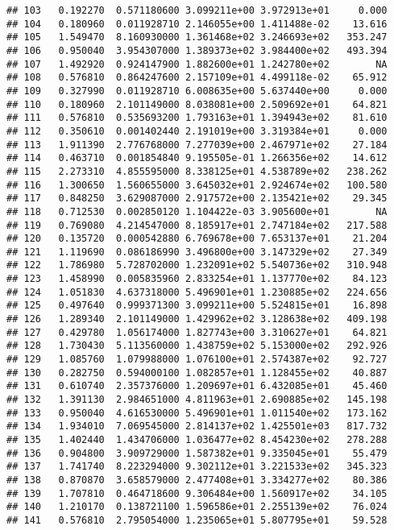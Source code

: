 \documentclass[
]{article}
\begin{document}
\begin{verbatim}
## 103   0.192270  0.571180600 3.099211e+00 3.972913e+01     0.000
## 104   0.180960  0.011928710 2.146055e+00 1.411488e-02    13.616
## 105   1.549470  8.160930000 1.361468e+02 3.246693e+02   353.247
## 106   0.950040  3.954307000 1.389373e+02 3.984400e+02   493.394
## 107   1.492920  0.924147900 1.882600e+01 1.242780e+02        NA
## 108   0.576810  0.864247600 2.157109e+01 4.499118e-02    65.912
## 109   0.327990  0.011928710 6.008635e+00 5.637440e+00     0.000
## 110   0.180960  2.101149000 8.038081e+00 2.509692e+01    64.821
## 111   0.576810  0.535693200 1.793163e+01 1.394943e+02    81.610
## 112   0.350610  0.001402440 2.191019e+00 3.319384e+01     0.000
## 113   1.911390  2.776768000 7.277039e+00 2.467971e+02    27.184
## 114   0.463710  0.001854840 9.195505e-01 1.266356e+02    14.612
## 115   2.273310  4.855595000 8.338125e+01 4.538789e+02   238.262
## 116   1.300650  1.560655000 3.645032e+01 2.924674e+02   100.580
## 117   0.848250  3.629087000 2.917572e+00 2.135421e+02    29.345
## 118   0.712530  0.002850120 1.104422e-03 3.905600e+01        NA
## 119   0.769080  4.214547000 8.185917e+01 2.747184e+02   217.588
## 120   0.135720  0.000542880 6.769678e+00 7.653137e+01    21.204
## 121   1.119690  0.086186990 3.496800e+00 3.147329e+02    27.349
## 122   1.786980  5.728702000 1.232091e+02 5.540736e+02   310.948
## 123   1.458990  0.005835960 2.833254e+01 1.137770e+02    84.123
## 124   1.051830  4.637318000 5.496901e+01 1.230885e+02   224.656
## 125   0.497640  0.999371300 3.099211e+00 5.524815e+01    16.898
## 126   1.289340  2.101149000 1.429962e+02 3.128638e+02   409.198
## 127   0.429780  1.056174000 1.827743e+00 3.310627e+01    64.821
## 128   1.730430  5.113560000 1.438759e+02 5.153000e+02   292.926
## 129   1.085760  1.079988000 1.076100e+01 2.574387e+02    92.727
## 130   0.282750  0.594000100 1.082857e+01 1.128455e+02    40.887
## 131   0.610740  2.357376000 1.209697e+01 6.432085e+01    45.460
## 132   1.391130  2.984651000 4.811963e+01 2.690885e+02   145.198
## 133   0.950040  4.616530000 5.496901e+01 1.011540e+02   173.162
## 134   1.934010  7.069545000 2.814137e+02 1.425501e+03   817.732
## 135   1.402440  1.434706000 1.036477e+02 8.454230e+02   278.288
## 136   0.904800  3.909729000 1.587382e+01 9.335045e+01    55.479
## 137   1.741740  8.223294000 9.302112e+01 3.221533e+02   345.323
## 138   0.870870  3.658579000 2.477408e+01 3.334277e+02    80.386
## 139   1.707810  0.464718600 9.306484e+00 1.560917e+02    34.105
## 140   1.210170  0.138721100 1.596586e+01 2.255139e+02    76.024
## 141   0.576810  2.795054000 1.235065e+01 5.807795e+01    59.528

\end{verbatim}
\end{document}
